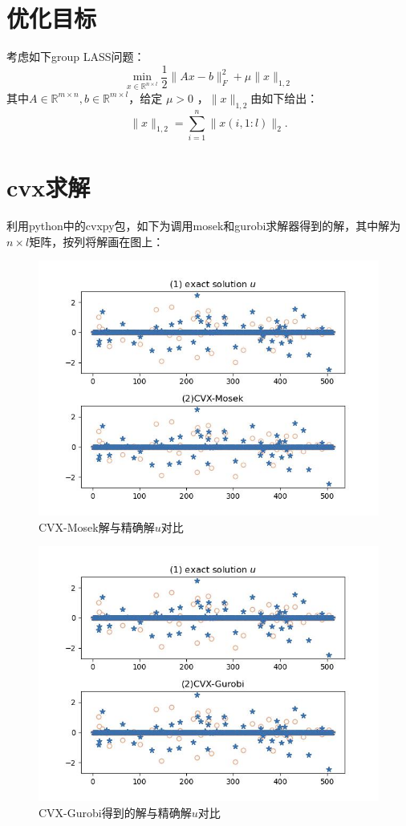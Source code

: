 \documentclass[12pt]{article}
\begin{document}
	\section{优化目标}
	考虑如下group LASS问题：
	$$
	\min _{x \in \mathbb{R}^{n \times l}} \frac{1}{2}\|A x-b\|_F^2+\mu\|x\|_{1,2}
	$$
	其中$A \in \mathbb{R}^{m \times n}, b \in \mathbb{R}^{m \times l}$，给定 $\mu>0$ ，$\|x\|_{1,2}$由如下给出：
	$$
	\|x\|_{1,2}=\sum_{i=1}^n\|x(i, 1: l)\|_2 .
	$$
	\section{cvx求解}
	利用python中的cvxpy包，如下为调用mosek和gurobi求解器得到的解，其中解为$n\times l$矩阵，按列将解画在图上：
\begin{figure}[H]
\centering
\includegraphics[width=\textwidth]{figs/CVX-Mosek.jpg}
\caption{CVX-Mosek解与精确解$u$对比}
\end{figure}

\begin{figure}[H]
	\centering
	\includegraphics[width=\textwidth]{figs/CVX-Gurobi.jpg}
	\caption{CVX-Gurobi得到的解与精确解$u$对比}
\end{figure}
	
\end{document}
